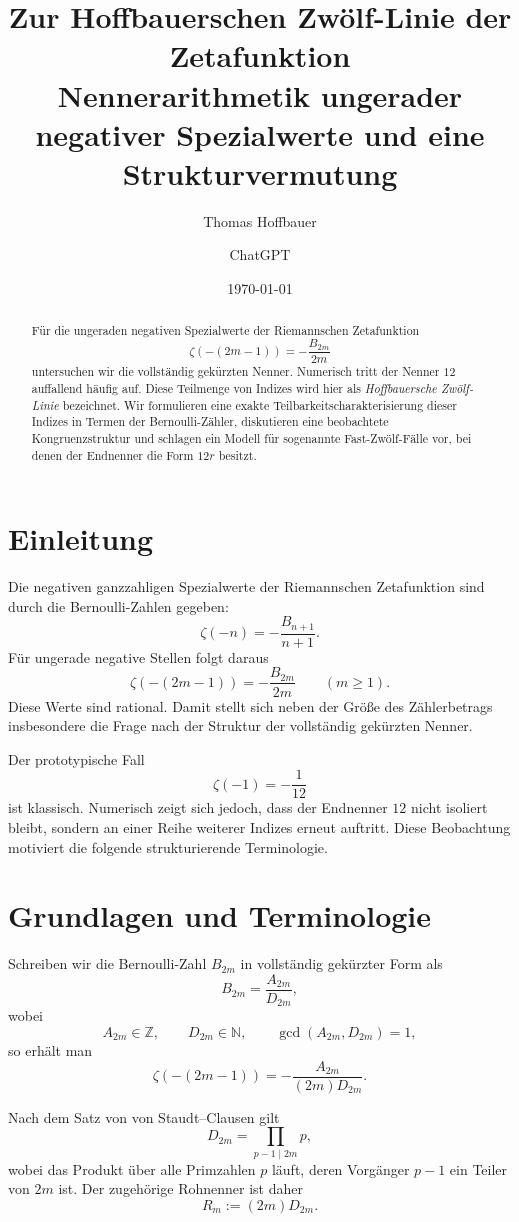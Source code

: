 \documentclass[11pt,a4paper]{article}
\title{\textbf{Zur Hoffbauerschen Zwölf-Linie der Zetafunktion}\\
\large Nennerarithmetik ungerader negativer Spezialwerte und eine Strukturvermutung}
\author{Thomas Hoffbauer \and ChatGPT}
\date{\today}
\theoremstyle{definition}
\theoremstyle{plain}
\theoremstyle{remark}
\begin{document}
\maketitle

\begin{abstract}
Für die ungeraden negativen Spezialwerte der Riemannschen Zetafunktion
\[
\zeta(-(2m-1))=-\frac{B_{2m}}{2m}
\]
untersuchen wir die vollständig gekürzten Nenner. Numerisch tritt der Nenner $12$ auffallend häufig auf. Diese Teilmenge von Indizes wird hier als \emph{Hoffbauersche Zwölf-Linie} bezeichnet. Wir formulieren eine exakte Teilbarkeitscharakterisierung dieser Indizes in Termen der Bernoulli-Zähler, diskutieren eine beobachtete Kongruenzstruktur und schlagen ein Modell für sogenannte Fast-Zwölf-Fälle vor, bei denen der Endnenner die Form $12r$ besitzt.
\end{abstract}

\section{Einleitung}

Die negativen ganzzahligen Spezialwerte der Riemannschen Zetafunktion sind durch die Bernoulli-Zahlen gegeben:
\[
\zeta(-n)=-\frac{B_{n+1}}{n+1}.
\]
Für ungerade negative Stellen folgt daraus
\[
\zeta(-(2m-1))=-\frac{B_{2m}}{2m}
\qquad (m\ge 1).
\]
Diese Werte sind rational. Damit stellt sich neben der Größe des Zählerbetrags insbesondere die Frage nach der Struktur der vollständig gekürzten Nenner.

Der prototypische Fall
\[
\zeta(-1)=-\frac{1}{12}
\]
ist klassisch. Numerisch zeigt sich jedoch, dass der Endnenner $12$ nicht isoliert bleibt, sondern an einer Reihe weiterer Indizes erneut auftritt. Diese Beobachtung motiviert die folgende strukturierende Terminologie.

\section{Grundlagen und Terminologie}

Schreiben wir die Bernoulli-Zahl $B_{2m}$ in vollständig gekürzter Form als
\[
B_{2m}=\frac{A_{2m}}{D_{2m}},
\]
wobei
\[
A_{2m}\in\mathbb Z,\qquad D_{2m}\in\mathbb N,\qquad \gcd(A_{2m},D_{2m})=1,
\]
so erhält man
\[
\zeta(-(2m-1))=-\frac{A_{2m}}{(2m)D_{2m}}.
\]

Nach dem Satz von von Staudt--Clausen gilt
\[
D_{2m}=\prod_{p-1\mid 2m} p,
\]
wobei das Produkt über alle Primzahlen $p$ läuft, deren Vorgänger $p-1$ ein Teiler von $2m$ ist. Der zugehörige Rohnenner ist daher
\[
R_m:=(2m)D_{2m}.
\]
\end{document}
